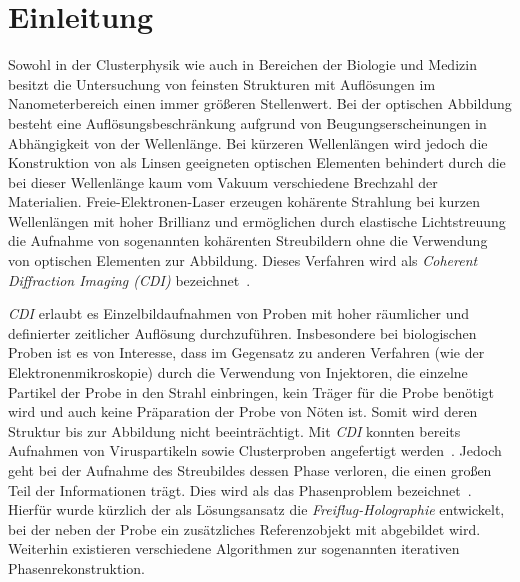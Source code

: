 \chapter{Einleitung}
Sowohl in der Clusterphysik wie auch in Bereichen der Biologie und Medizin besitzt die Untersuchung von feinsten Strukturen mit Auflösungen im Nanometerbereich einen immer größeren Stellenwert. Bei der optischen Abbildung besteht eine Auflösungsbeschränkung aufgrund von Beugungserscheinungen in Abhängigkeit von der Wellenlänge. Bei kürzeren Wellenlängen wird jedoch die Konstruktion von als Linsen geeigneten optischen Elementen behindert durch die bei dieser Wellenlänge kaum vom Vakuum verschiedene Brechzahl der Materialien.
Freie-Elektronen-Laser erzeugen kohärente Strahlung bei kurzen Wellenlängen mit hoher Brillianz und ermöglichen durch elastische Lichtstreuung die Aufnahme von sogenannten kohärenten Streubildern ohne die Verwendung von optischen Elementen zur Abbildung. Dieses Verfahren wird als \textit{Coherent Diffraction Imaging (CDI)} bezeichnet~\cite{schultz2013chapter7}.

\textit{CDI} erlaubt es Einzelbildaufnahmen von Proben mit hoher räumlicher und definierter zeitlicher Auflösung durchzuführen. Insbesondere bei biologischen Proben ist es von Interesse, dass im Gegensatz zu anderen Verfahren (wie der Elektronenmikroskopie) durch die Verwendung von Injektoren, die einzelne Partikel der Probe in den Strahl einbringen, kein Träger für die Probe benötigt wird und auch keine Präparation der Probe von Nöten ist. Somit wird deren Struktur bis zur Abbildung nicht beeinträchtigt. Mit \textit{CDI} konnten bereits Aufnahmen von Viruspartikeln sowie Clusterproben angefertigt werden~\cite{seibert2011}. Jedoch geht bei der Aufnahme des Streubildes dessen Phase verloren, die einen großen Teil der Informationen trägt. Dies wird als das Phasenproblem bezeichnet~\cite{shechtman2015}. Hierfür wurde kürzlich der als Lösungsansatz die \textit{Freiflug-Holographie} entwickelt, bei der neben der Probe ein zusätzliches Referenzobjekt mit abgebildet wird. Weiterhin existieren verschiedene Algorithmen zur sogenannten  iterativen Phasenrekonstruktion.

